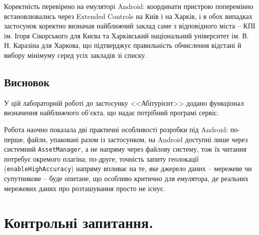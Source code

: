 \documentclass[14pt, a4paper]{extreport}
\begin{document}
	Коректність перевірено на емуляторі Android: координати пристрою поперемінно встановлювались через Extended Controls на Київ і на Харків, і в обох випадках застосунок коректно визначав найближчий заклад саме з відповідного міста -- КПІ ім. Ігоря Сікорського для Києва та Харківський національний університет ім. В. Н. Каразіна для Харкова, що підтверджує правильність обчислення відстані й вибору мінімуму серед усіх закладів зі списку.
	
	
	\subsection*{Висновок}

	У цій лабораторній роботі до застосунку <<Абітурієнт>> додано функціонал визначення найближчого об'єкта, що надає потрібний програмі сервіс.
	
	Робота наочно показала дві практичні особливості розробки під Android: по-перше, файли, упаковані разом із застосунком, на Android доступні лише через системний \texttt{AssetManager}, а не напряму через файлову систему, тож їх читання потребує окремого плагіна; по-друге, точність запиту геолокації (\texttt{enableHighAccuracy}) напряму впливає на те, яке джерело даних -- мережеве чи супутникове -- буде опитане, що особливо критично для емулятора, де реальних мережевих даних про розташування просто не існує.
	
	\section*{Контрольні запитання.}
\end{document}
